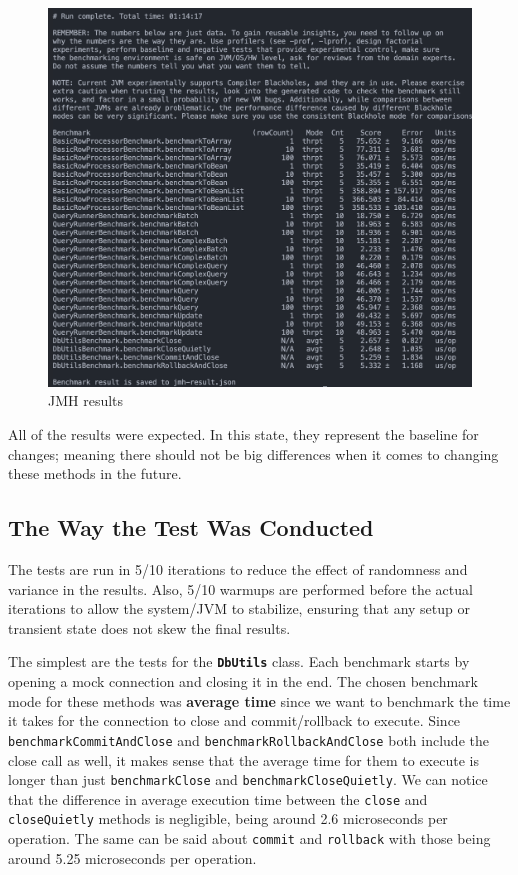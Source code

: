 \documentclass[sigconf]{acmart}
\begin{document}
\begin{figure}[H]
    \centering
    \includegraphics[width=1\linewidth]{images/jmh.png}
    \caption{JMH results}
\end{figure}

All of the results were expected. In this state, they represent the baseline for changes; meaning there should not be big differences when it comes to changing these methods in the future.

\subsection*{The Way the Test Was Conducted}

The tests are run in 5/10 iterations to reduce the effect of randomness and variance in the results. Also, 5/10 warmups are performed before the actual iterations to allow the system/JVM to stabilize, ensuring that any setup or transient state does not skew the final results.

The simplest are the tests for the \texttt{\textbf{DbUtils}} class. Each benchmark starts by opening a mock connection and closing it in the end. The chosen benchmark mode for these methods was \textbf{average time} since we want to benchmark the time it takes for the connection to close and commit/rollback to execute. Since \texttt{benchmarkCommitAndClose} and \texttt{benchmarkRollbackAndClose} both include the close call as well, it makes sense that the average time for them to execute is longer than just \texttt{benchmarkClose} and \texttt{benchmarkCloseQuietly}. We can notice that the difference in average execution time between the \texttt{close} and \texttt{closeQuietly} methods is negligible, being around 2.6 microseconds per operation. The same can be said about \texttt{commit} and \texttt{rollback} with those being around 5.25 microseconds per operation.
\end{document}
